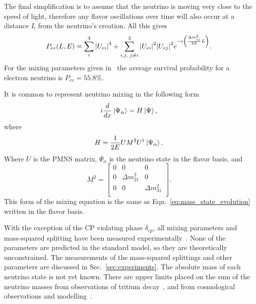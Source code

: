 The final simplification is to assume that the neutrino is moving very close
to the speed of light, therefore any flavor oscillations over time will also
occur at a distance $L$ from the neutrino's creation.
All this gives
\begin{equation}
    \label{eqn:pee_adiabatic}
    P_{ee}(L,E) = \sum_{i}^{3}\abs{U_{ei}}^4 +
    \sum_{i,j\text{, }j \ne i}^{3}
    \abs{U_{ei}}^2\abs{U_{ej}}^2e^{-i\left(\frac{\Delta m^{2}_{ij}}{2E}L\right)}\text{.}
\end{equation}
For the mixing parameters given in~\citep{pdg16} the average survival probability
for a electron neutrino is $P_{ee} = 55.8\%$.

It is common to represent neutrino mixing in the following form
\begin{equation}
i\frac{d}{dx}\ket{\Psi_{\alpha}} = H\ket{\Psi}\text{,}
\label{eq:mixing_hamiltonian}
\end{equation}
where
\begin{equation}
    H = \frac{1}{2E}UM^{2}U^{\dagger}\ket{\Psi_{\alpha}}\text{.}
\end{equation}
Where $U$ is the PMNS matrix, $\Psi_{\alpha}$ is the neutrino state in the  flavor
basis, and
\begin{equation}
M^{2} = 
\begin{bmatrix}
    0 & 0 & 0  \\
    0 & \Delta m^{2}_{21} & 0  \\
    0 & 0 & \Delta m^{2}_{31}  \\
\end{bmatrix}\text{.}
\end{equation}
This form of the mixing equation is the same as Eqn.~\eqref{eq:mass_state_evolution}
written in the flavor basis.


With the exception of the CP violating phase $\delta_{cp}$, all mixing
parameters and mass-squared splitting have been measured experimentally~\citep{pdg_globalfit}.
None of the parameters are predicted in the standard model, so they are theoretically
unconstrained.
The measurements of the mass-squared splittings and
other parameters are discussed in Sec.~\ref{sec:experiments}.
The absolute mass of each neutrino state is not yet known.
There are upper limits placed on the sum of the neutrino masses from
observations of tritium decay~\citep{troitsk_mass}, and from cosmological
observations and modelling~\citep{cosmological_neutrino_mass}.

